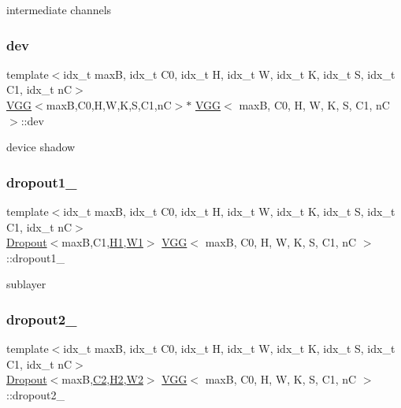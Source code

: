 intermediate channels \mbox{\label{structVGG_acb66854790b4211ec6964690dcaba67b}} 
\subsubsection{\texorpdfstring{dev}{dev}}
{\footnotesize\ttfamily template$<$idx\+\_\+t maxB, idx\+\_\+t C0, idx\+\_\+t H, idx\+\_\+t W, idx\+\_\+t K, idx\+\_\+t S, idx\+\_\+t C1, idx\+\_\+t nC$>$ \\
\hyperlink{structVGG}{V\+GG}$<$maxB,C0,H,W,K,S,C1,nC$>$$\ast$ \hyperlink{structVGG}{V\+GG}$<$ maxB, C0, H, W, K, S, C1, nC $>$\+::dev}

device shadow \mbox{\label{structVGG_ac98c33f424e29ec2e36fb4348586b4fd}} 
\subsubsection{\texorpdfstring{dropout1\+\_}{dropout1\_1}}
{\footnotesize\ttfamily template$<$idx\+\_\+t maxB, idx\+\_\+t C0, idx\+\_\+t H, idx\+\_\+t W, idx\+\_\+t K, idx\+\_\+t S, idx\+\_\+t C1, idx\+\_\+t nC$>$ \\
\hyperlink{structDropout}{Dropout}$<$maxB,C1,\hyperlink{structVGG_a73f189c70eef33b8e8de32929db37b10}{H1},\hyperlink{structVGG_a01305ab6d90c95eb50c45352203b07e0}{W1}$>$ \hyperlink{structVGG}{V\+GG}$<$ maxB, C0, H, W, K, S, C1, nC $>$\+::dropout1\+\_}

sublayer \mbox{\label{structVGG_a691b281e14f4c2c17bcf2f5fa25b950d}} 
\subsubsection{\texorpdfstring{dropout2\+\_}{dropout2\_1}}
{\footnotesize\ttfamily template$<$idx\+\_\+t maxB, idx\+\_\+t C0, idx\+\_\+t H, idx\+\_\+t W, idx\+\_\+t K, idx\+\_\+t S, idx\+\_\+t C1, idx\+\_\+t nC$>$ \\
\hyperlink{structDropout}{Dropout}$<$maxB,\hyperlink{structVGG_a1e9ad0d15e42696798d44b06ad3c9a9a}{C2},\hyperlink{structVGG_a6658da7d5fd275b2af6eb75511ba6f80}{H2},\hyperlink{structVGG_ac4a4d00b5e2ee41b1d4e8861bbc6c499}{W2}$>$ \hyperlink{structVGG}{V\+GG}$<$ maxB, C0, H, W, K, S, C1, nC $>$\+::dropout2\+\_}

